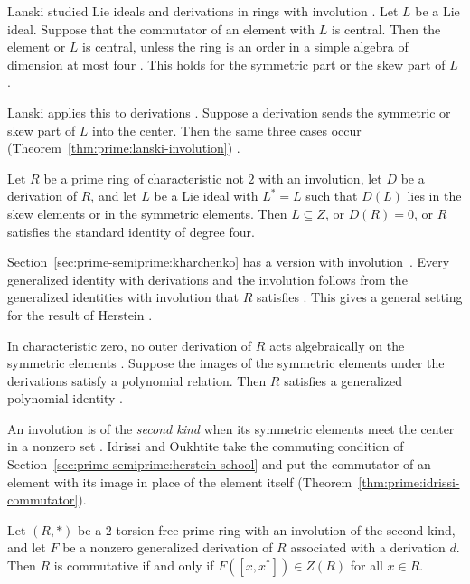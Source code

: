 Lanski studied Lie ideals and derivations in rings with involution
\cite[p.~449]{Lanski1977}. Let $L$ be a Lie ideal. Suppose that the commutator
of an element with $L$ is central. Then the element or $L$ is central, unless
the ring is an order in a simple algebra of dimension at most four
\cite[p.~449]{Lanski1977}. This holds for the symmetric part or the skew part
of $L$ \cite[p.~449]{Lanski1977}.

Lanski applies this to derivations \cite[p.~449]{Lanski1977}. Suppose a
derivation sends the symmetric or skew part of $L$ into the center. Then the
same three cases occur (Theorem~\ref{thm:prime:lanski-involution})
\cite[p.~449]{Lanski1977}.

\begin{theorem}\label{thm:prime:lanski-involution}
Let $R$ be a prime ring of characteristic not $2$ with an involution, let $D$ be
a derivation of $R$, and let $L$ be a Lie ideal with $L^*=L$ such that $D(L)$ lies
in the skew elements or in the symmetric elements. Then $L\subseteq Z$, or
$D(R)=0$, or $R$ satisfies the standard identity of degree four.
\end{theorem}

Section~\ref{sec:prime-semiprime:kharchenko} has a version with involution~\cite[p.~765]{Lanski1985}.
Every generalized identity with derivations and the involution follows from
the generalized identities with involution that $R$ satisfies
\cite[p.~765]{Lanski1985}. This gives a general setting for the result of
Herstein \cite[p.~765]{Lanski1985}.

In characteristic zero, no outer derivation of $R$ acts algebraically on the
symmetric elements \cite[p.~765]{Lanski1985}. Suppose the images of the
symmetric elements under the derivations satisfy a polynomial relation. Then
$R$ satisfies a generalized polynomial identity \cite[p.~765]{Lanski1985}.

An involution is of the \emph{second kind} when its symmetric elements meet
the center in a nonzero set \cite[p.~1950001-1]{Idrissi2019}. Idrissi and
Oukhtite take the commuting condition of
Section~\ref{sec:prime-semiprime:herstein-school} and put the commutator of an
element with its image in place of the element itself
\cite[p.~1950001-4]{Idrissi2019} (Theorem~\ref{thm:prime:idrissi-commutator}).

\begin{theorem}\label{thm:prime:idrissi-commutator}
Let $(R,*)$ be a $2$-torsion free prime ring with an involution of the second kind,
and let $F$ be a nonzero generalized derivation of $R$ associated with a derivation
$d$. Then $R$ is commutative if and only if $F([x,x^{*}])\in Z(R)$ for all $x\in R$.
\end{theorem}

